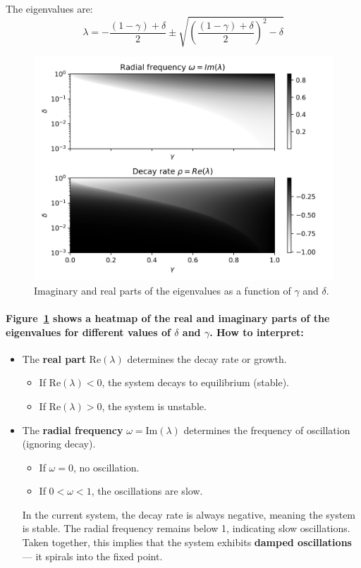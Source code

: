 \documentclass{article}
\begin{document}
The eigenvalues are:
\[
\lambda = -\frac{(1 - \gamma) + \delta}{2} 
\pm 
\sqrt{\left( \frac{(1 - \gamma) + \delta}{2} \right)^2 - \delta}
\]

\begin{figure}[H]
    \centering
    \includegraphics[width=\linewidth]{SingleSpecies/RadFreq.png}
    \caption{Imaginary and real parts of the eigenvalues as a function of $\gamma$ and $\delta$.}
    \label{fig:RealandImaginaryPart}
\end{figure}


\paragraph{Figure~\ref{fig:RealandImaginaryPart} shows a heatmap of the real and imaginary parts of the eigenvalues for different values of $\delta$ and $\gamma$.
How to interpret:}
\begin{itemize}
    \item The \textbf{real part} $\text{Re}(\lambda)$ determines the decay rate or growth.
        \begin{itemize}
            \item If $\text{Re}(\lambda) < 0$, the system decays to equilibrium (stable).
            \item If $\text{Re}(\lambda) > 0$, the system is unstable.
        \end{itemize}
    \item The \textbf{radial frequency} $\omega = \text{Im}(\lambda)$ determines the frequency of oscillation (ignoring decay).
        \begin{itemize}
            \item If $\omega = 0$, no oscillation.
            \item If $0 < \omega < 1$, the oscillations are slow.
        \end{itemize}
In the current system, the decay rate is always negative, meaning the system is stable. The radial frequency remains below 1, indicating slow oscillations. Taken together, this implies that the system exhibits \textbf{damped oscillations} — it spirals into the fixed point.
\end{itemize}
\end{document}
